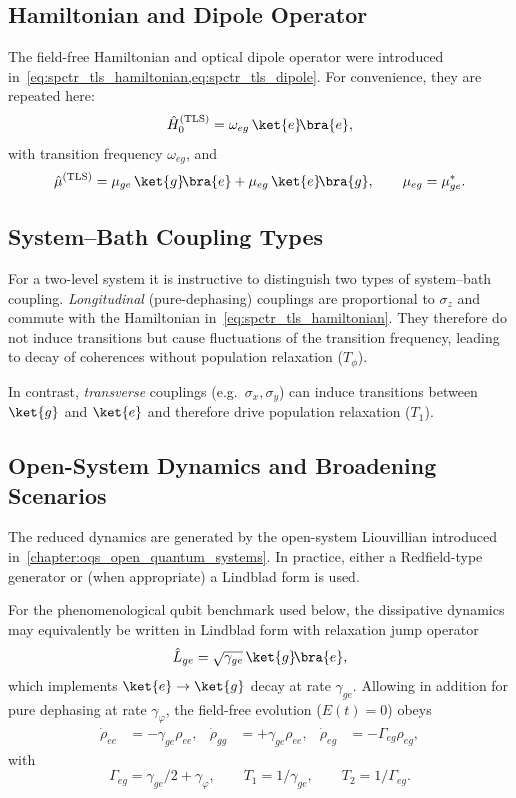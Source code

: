 \subsection{Hamiltonian and Dipole Operator}

The field-free Hamiltonian and optical dipole operator were introduced in~\autoref{eq:spctr_tls_hamiltonian,eq:spctr_tls_dipole}.
For convenience, they are repeated here:
\begin{equation*}
	\hat{H}_{0}^{(\mathrm{TLS})} = \omega_{eg}\,\ket{e}\!\bra{e},
\end{equation*}
with transition frequency $\omega_{eg}$, and
\begin{equation*}
	\hat{\mu}^{(\mathrm{TLS})}
	= \mu_{ge}\,\ket{g}\!\bra{e} + \mu_{eg}\,\ket{e}\!\bra{g},
	\qquad \mu_{eg}=\mu_{ge}^*.
\end{equation*}

\subsection{System--Bath Coupling Types}

For a two-level system it is instructive to distinguish two types of system--bath coupling. 
\textit{Longitudinal} (pure-dephasing) couplings are proportional to $\sigma_z$ and commute with the Hamiltonian in~\autoref{eq:spctr_tls_hamiltonian}. They therefore do not induce transitions but cause fluctuations of the transition frequency, leading to decay of coherences without population relaxation ($T_\phi$). 

In contrast, \textit{transverse} couplings (e.g.\ $\sigma_x,\sigma_y$) can induce transitions between $\ket{g}$ and $\ket{e}$ and therefore drive population relaxation ($T_1$).

\subsection{Open-System Dynamics and Broadening Scenarios}

The reduced dynamics are generated by the open-system Liouvillian introduced in~\autoref{chapter:oqs_open_quantum_systems}. In practice, either a Redfield-type generator or (when appropriate) a Lindblad form is used.

For the phenomenological qubit benchmark used below, the dissipative dynamics may equivalently be written in Lindblad form with relaxation jump operator
\begin{equation*}
\hat{L}_{ge}=\sqrt{\gamma_{ge}}\,\ket{g}\!\bra{e},
\end{equation*}
which implements $\ket{e}\rightarrow\ket{g}$ decay at rate $\gamma_{ge}$. 
Allowing in addition for pure dephasing at rate $\gamma_{\varphi}$, the field-free evolution ($E(t)=0$) obeys
\begin{align*}
\dot{\rho}_{ee} &= -\gamma_{ge}\rho_{ee}, &
\dot{\rho}_{gg} &= +\gamma_{ge}\rho_{ee}, &
\dot{\rho}_{eg} &= -\Gamma_{eg}\rho_{eg},
\end{align*}
with
\begin{equation*}
\Gamma_{eg}=\gamma_{ge}/2+\gamma_{\varphi},
\qquad
T_1=1/\gamma_{ge},
\qquad
T_2=1/\Gamma_{eg}.
\end{equation*}


